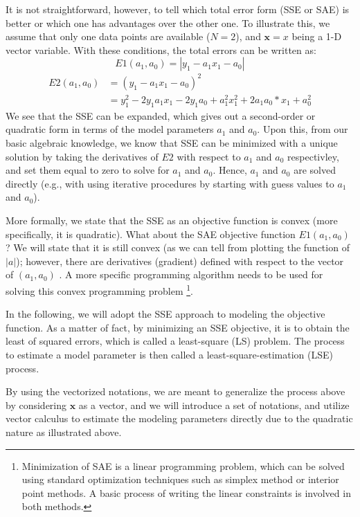 \documentclass[12pt]{article}
\begin{document}
It is not straightforward, however, to tell which total error form (SSE or SAE) is better or which one has advantages over the other one. To illustrate this, we assume that only one data points are available ($N = 2$), and $\mathbf{x} = x$ being a 1-D vector variable. With these conditions, the total errors can be written as:
\[
E1(a_1, a_0) = |y_1 - a_1 x_1 - a_0|
\]
\[
\begin{split}
    E2(a_1, a_0) &= (y_1 - a_1 x_1 - a_0)^2\\
    & = y_1^2 - 2y_1a_1x_1 - 2y_1a_0 + a_1^2x_1^2 + 2a_1a_0*x_1 + a_0^2
\end{split}
\]
We see that the SSE can be expanded, which gives out a second-order or quadratic form in terms of the model parameters $a_1$ and $a_0$. Upon this, from our basic algebraic knowledge, we know that SSE can be minimized with a unique solution by taking the derivatives of $E2$ with respect to $a_1$ and $a_0$ respectivley, and set them equal to zero to solve for $a_1$ and $a_0$. Hence, $a_1$ and $a_0$ are solved directly (e.g., with using iterative procedures by starting with guess values to $a_1$ and $a_0$).

More formally, we state that the SSE as an objective function is convex (more specifically, it is quadratic). What about the SAE objective function $E1(a_1, a_0)$? We will state that it is still convex (as we can tell from plotting the function of $|a|$); however, there are derivatives (gradient) defined with respect to the vector of $(a_1, a_0)$ . A more specific programming algorithm needs to be used for solving this convex programming problem \footnote{Minimization of SAE is a linear programming problem, which can be solved using standard optimization techniques such as simplex method or interior point methods. A basic process of writing the linear constraints is involved in both methods.}. 

In the following, we will adopt the SSE approach to modeling the objective function. As a matter of fact, by minimizing an SSE objective, it is to obtain the least of squared errors, which is called a least-square (LS) problem. The process to estimate a model parameter is then called a least-square-estimation (LSE) process. 

By using the vectorized notations, we are meant to generalize the process above by considering $\mathbf{x}$ as a vector, and we will introduce a set of notations, and utilize vector calculus to estimate the modeling parameters directly due to the quadratic nature as illustrated above. 
\end{document}
